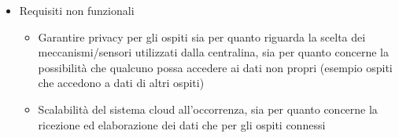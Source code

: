 \begin{itemize}
    \item Requisiti non funzionali
    \begin{itemize}
        \item Garantire privacy per gli ospiti sia per quanto riguarda la scelta dei meccanismi/sensori utilizzati dalla centralina, 
                sia per quanto concerne la possibilità che qualcuno possa accedere ai dati non propri (esempio ospiti che accedono a dati di altri ospiti)
        \item Scalabilità del sistema cloud all'occorrenza, sia per quanto concerne la ricezione ed elaborazione dei dati che per gli ospiti connessi
    \end{itemize}
\end{itemize}
